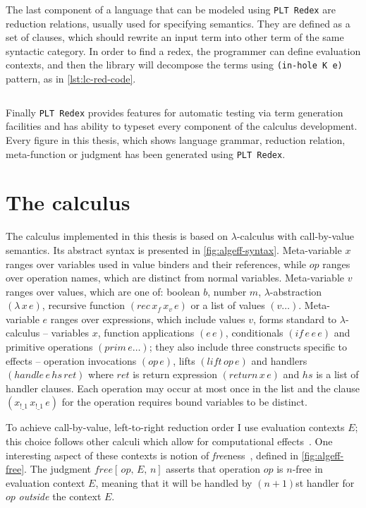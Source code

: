 \documentclass[inz, english, longabstract]{iithesis}
\newcommand{\Redex}{\texttt{PLT Redex}}
\newcommand{\LC}{\(\lambda\)-calculus}
\begin{document}
The last component of a language that can be modeled using \Redex{} are reduction relations, usually used for specifying semantics.
They are defined as a set of clauses, which should rewrite an input term into other term of the same syntactic category.
In order to find a redex, the programmer can define evaluation contexts, and then the library will decompose the terms using \texttt{(in-hole K e)} pattern, as in \autoref{lst:lc-red-code}.
\begin{listing}[t]
  \inputminted[firstline=19,lastline=23]{Racket}{../lc/lc.rkt}
  \caption{Reduction relation for \LC{} in \Redex{}}
  \label{lst:lc-red-code}
\end{listing}
Finally \Redex{} provides features for automatic testing via term generation facilities and has ability to typeset every component of the calculus development.
Every figure in this thesis, which shows language grammar, reduction relation, meta-function or judgment has been generated using \Redex{}.

\chapter{The calculus}\label{ch:calculus}
The calculus implemented in this thesis is based on \LC{} with call-by-value semantics.
Its abstract syntax is presented in \autoref{fig:algeff-syntax}.
Meta-variable $ x $ ranges over variables used in value binders and their references, while $ op $ ranges over operation names, which are distinct from normal variables.
Meta-variable $ v $ ranges over values, which are one of: boolean $ b $, number $ m $, $ \lambda $-abstraction $(\lambda \, x \, e)$, recursive function $(rec \, x_f \, x_v \, e)$ or a list of values $(v \ldots)$.
Meta-variable $ e $ ranges over expressions, which include values $ v $, forms standard to \LC{} -- variables $ x $, function applications $ (e \, e) $, conditionals $ (if \, e \,e \, e) $ and primitive operations $ (prim \, e \ldots) $; they also include three constructs specific to effects -- operation invocations $ (op \, e) $, lifts $ (lift \, op \, e) $ and handlers $ (handle \, e \, hs \, ret) $ where $ ret $ is return expression $ (return \, x \, e) $ and $ hs $ is a list of handler clauses.
Each operation may occur at most once in the list and the clause $(x_{!\_1} \, x_{!\_1} \, e)$ for the operation requires bound variables to be distinct.

To achieve call-by-value, left-to-right reduction order I use evaluation contexts $ E $; this choice follows other calculi which allow for computational effects~\cite{Biernacki2017, Leijen2014, Hillerstrom2016}.
One interesting aspect of these contexts is notion of \emph{free}ness~\cite{Biernacki2017}, defined in \autoref{fig:algeff-free}.
The judgment $ free[ \, op , \, E , \, n] $ asserts that operation $ op $ is $ n $-free in evaluation context $ E $, meaning that it will be handled by $(n + 1)$st handler for $ op $ \emph{outside} the context $ E $.
\end{document}
